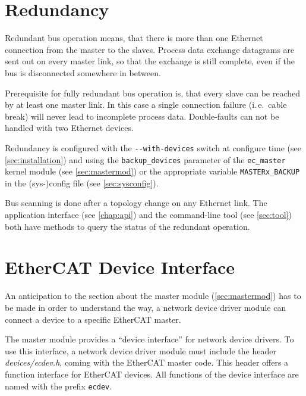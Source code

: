 \documentclass[a4paper,12pt,BCOR=6mm,bibtotoc,idxtotoc]{scrbook}
\begin{document}

\section{Redundancy}
\label{sec:redundancy}

Redundant bus operation means, that there is more than one Ethernet connection
from the master to the slaves. Process data exchange datagrams are sent out on
every master link, so that the exchange is still complete, even if the bus is
disconnected somewhere in between.

Prerequisite for fully redundant bus operation is, that every slave can be
reached by at least one master link. In this case a single connection failure
(i.\,e.~cable break) will never lead to incomplete process data. Double-faults
can not be handled with two Ethernet devices.

Redundancy is configured with the \lstinline+--with-devices+ switch at
configure time (see \autoref{sec:installation}) and using the
\lstinline+backup_devices+ parameter of the \lstinline+ec_master+ kernel
module (see \autoref{sec:mastermod}) or the appropriate variable
\lstinline+MASTERx_BACKUP+ in the (sys-)config file (see
\autoref{sec:sysconfig}).

Bus scanning is done after a topology change on any Ethernet link. The
application interface (see \autoref{chap:api}) and the command-line tool (see
\autoref{sec:tool}) both have methods to query the status of the redundant
operation.


\section{EtherCAT Device Interface}
\label{sec:ecdev}

An anticipation to the section about the master module
(\autoref{sec:mastermod}) has to be made in order to understand the way, a
network device driver module can connect a device to a specific EtherCAT
master.

The master module provides a ``device interface'' for network device drivers.
To use this interface, a network device driver module must include the header
\textit{devices/ecdev.h}, coming with the
EtherCAT master code. This header offers a function interface for EtherCAT
devices. All functions of the device interface are named with the prefix
\lstinline+ecdev+.
\end{document}
